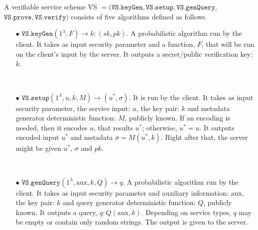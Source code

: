 \begin{definition}[VS Scheme]\label{service-def}
A verifiable service scheme VS $=(\mathtt{VS.keyGen}, \mathtt{VS.setup},\mathtt{VS.genQuery},$ $\mathtt{VS.prove},\mathtt{VS.verify})$ consists of five algorithms defined as follows.






\begin{itemize}

\item[$\bullet$] $\mathtt{VS.keyGen}(1^{\lambda},F)\rightarrow k:(sk,pk)$.  A probabilistic algorithm run by the client. It takes as input security parameter and a function, $F$, that will be run on the client's input by the server. It outputs a secret/public verification key: $k$. 

\

\item[$\bullet$] $\mathtt{VS.setup}(1^{\lambda}, u,k, M)\rightarrow (u^{\scriptscriptstyle *},\sigma)$. It is run by the client. It takes as input security parameter,  the service input: $u$,  the key pair: $k$ and metadata generator deterministic function: $M$, publicly known. If an encoding is needed, then it encodes $u$, that results $u^{\scriptscriptstyle *}$; otherwise, $u^*=u$. It outputs encoded input $u^{\scriptscriptstyle *}$ and metadata $\sigma=M(u^{\scriptscriptstyle *},k)$. Right after that, the server might be given $u^{\scriptscriptstyle *}$,  $\sigma$ and $pk$. 

\

\item[$\bullet$] $\mathtt{VS.genQuery}(1^{\lambda}, \text{aux},k,Q)\rightarrow q$. A probabilistic algorithm run by the client. It takes as input security parameter and auxiliary information: $\text{aux}$,  the key pair: $k$  and query generator deterministic function: $Q$,  publicly known. It outputs  a query, $q:Q( \text{aux},k)$.  Depending on service types, $q$ may be empty or contain only random strings. The output  is given to the server. 

\


\end{itemize}
\end{definition}
